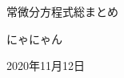 \documentclass[12pt,openany]{jbook}
\begin{document}
\begin{center}
    \LARGE{常微分方程式総まとめ}
    
    \Large{\vspace{19cm}にゃにゃん}
    
    \Large{2020年11月12日}
\end{center}
\thispagestyle{empty}
\clearpage

\tableofcontents
\thispagestyle{empty}
\clearpage

\setcounter{page}{1}



%

%
\end{document}
